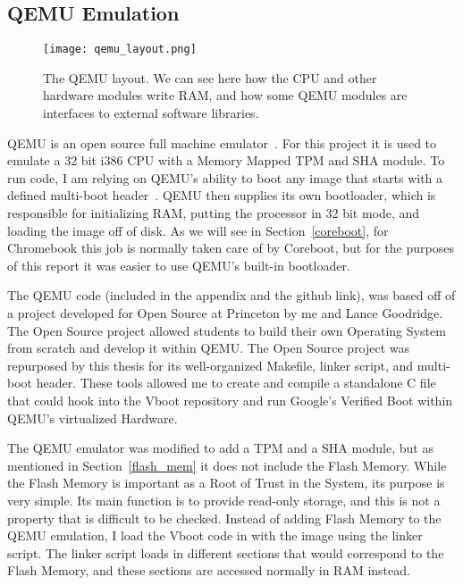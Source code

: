 \documentclass[../report.tex]{subfiles}
\begin{document}
\subsection{QEMU Emulation}\label{qemu_em}

\begin{figure}
  \centering
  \texttt{[image: qemu\_layout.png]}
  \caption{The QEMU layout. We can see here how the CPU and other hardware modules write RAM, and how some QEMU modules are interfaces to external software libraries.}
  \label{fig:qemu_layout}
\end{figure}

QEMU is an open source full machine emulator~\cite{qemu-site}.
For this project it is used to emulate a 32 bit i386 CPU with a Memory Mapped TPM and SHA module.
To run code, I am relying on QEMU's ability to boot any image that starts with a defined multi-boot header~\cite{multiboot}.
QEMU then supplies its own bootloader, which is responsible for initializing RAM, putting the processor in 32 bit mode, and loading the image off of disk.
As we will see in Section~\ref{coreboot}, for Chromebook this job is normally taken care of by Coreboot, but for the purposes of this report it was easier to use QEMU's built-in bootloader.

The QEMU code (included in the appendix and the github link), was based off of a project developed for Open Source at Princeton by me and Lance Goodridge.
The Open Source project allowed students to build their own Operating System from scratch and develop it within QEMU\@.
The Open Source project was repurposed by this thesis for its well-organized Makefile, linker script, and multi-boot header.
These tools allowed me to create and compile a standalone C file that could hook into the Vboot repository and run Google's Verified Boot within QEMU's virtualized Hardware.

The QEMU emulator was modified to add a TPM and a SHA module, but as mentioned in Section~\ref{flash_mem} it does not include the Flash Memory.
While the Flash Memory is important as a Root of Trust in the System, its purpose is very simple.
Its main function is to provide read-only storage, and this is not a property that is difficult to be checked.
Instead of adding Flash Memory to the QEMU emulation, I load the Vboot code in with the image using the linker script. %
The linker script loads in different sections that would correspond to the Flash Memory, and these sections are accessed normally in RAM instead.

\end{document}
